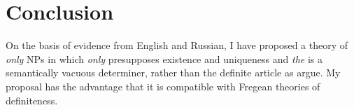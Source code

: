 \section{Conclusion \label{sec:conclusion}}
On the basis of evidence from English and Russian, I have proposed a theory of \textit{only} NPs in which \textit{only} presupposes existence and uniqueness and \textit{the} is a semantically vacuous determiner, rather than the definite article as \citet{cb2015} argue. My proposal has the advantage that it is compatible with Fregean theories of definiteness.

